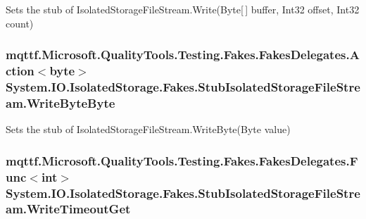 Sets the stub of Isolated\-Storage\-File\-Stream.\-Write(\-Byte\mbox{[}$\,$\mbox{]} buffer, Int32 offset, Int32 count)

\hypertarget{class_system_1_1_i_o_1_1_isolated_storage_1_1_fakes_1_1_stub_isolated_storage_file_stream_a3727ac80b3b42db6739fe7b4369d3257}{
\subsubsection[{Write\-Byte\-Byte}]{\setlength{\rightskip}{0pt plus 5cm}mqttf.\-Microsoft.\-Quality\-Tools.\-Testing.\-Fakes.\-Fakes\-Delegates.\-Action$<$byte$>$ System.\-I\-O.\-Isolated\-Storage.\-Fakes.\-Stub\-Isolated\-Storage\-File\-Stream.\-Write\-Byte\-Byte}}\label{class_system_1_1_i_o_1_1_isolated_storage_1_1_fakes_1_1_stub_isolated_storage_file_stream_a3727ac80b3b42db6739fe7b4369d3257}


Sets the stub of Isolated\-Storage\-File\-Stream.\-Write\-Byte(\-Byte value)

\hypertarget{class_system_1_1_i_o_1_1_isolated_storage_1_1_fakes_1_1_stub_isolated_storage_file_stream_a6ffb4ca1b30538396f5b1beeee144f03}{
\subsubsection[{Write\-Timeout\-Get}]{\setlength{\rightskip}{0pt plus 5cm}mqttf.\-Microsoft.\-Quality\-Tools.\-Testing.\-Fakes.\-Fakes\-Delegates.\-Func$<$int$>$ System.\-I\-O.\-Isolated\-Storage.\-Fakes.\-Stub\-Isolated\-Storage\-File\-Stream.\-Write\-Timeout\-Get}}\label{class_system_1_1_i_o_1_1_isolated_storage_1_1_fakes_1_1_stub_isolated_storage_file_stream_a6ffb4ca1b30538396f5b1beeee144f03}


